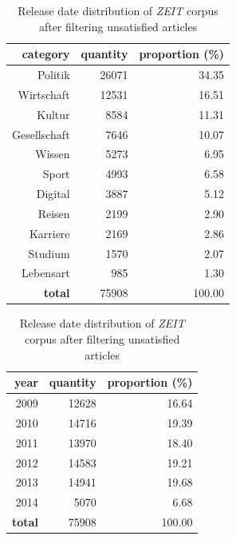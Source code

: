 \begin{table}[!ht]
\centering
\begin{minipage}[b]{.48\linewidth}
\centering
\begin{tabular}{rrr}
\hline
\textbf{category} &   \textbf{quantity} &   \textbf{proportion (\%)} \\
\hline
Politik      &      26071 &            34.35 \\
Wirtschaft   &      12531 &            16.51 \\
Kultur       &       8584 &            11.31 \\
Gesellschaft &       7646 &            10.07 \\
Wissen       &       5273 &             6.95 \\
Sport        &       4993 &             6.58 \\
Digital      &       3887 &             5.12 \\
Reisen       &       2199 &             2.90 \\
Karriere     &       2169 &             2.86 \\
Studium      &       1570 &             2.07 \\
Lebensart    &        985 &             1.30 \\
\hline
\textbf{total}        &      75908 &           100.00 \\
\hline
\end{tabular}
\caption{Category distribution of \textit{ZEIT} corpus after filtering unsatisfied articles}
\label{tab:cate_dist_new}

\end{minipage}
\begin{minipage}[b]{.48\linewidth}
\centering
\begin{tabular}{rrr}
\hline
\textbf{year} &   \textbf{quantity} &   \textbf{proportion (\%)} \\
\hline
2009 & 12628 &            16.64 \\
2010 & 14716 &            19.39 \\
2011 & 13970 &            18.40 \\
2012 & 14583 &            19.21 \\
2013 & 14941 &            19.68 \\
2014 &  5070 &             6.68 \\
\hline
\textbf{total} & 75908 &           100.00 \\
\hline
\end{tabular}
\caption{Release date distribution of \textit{ZEIT} corpus after filtering unsatisfied articles}
\label{tab:release_dist_new}
\end{minipage}
\end{table}

